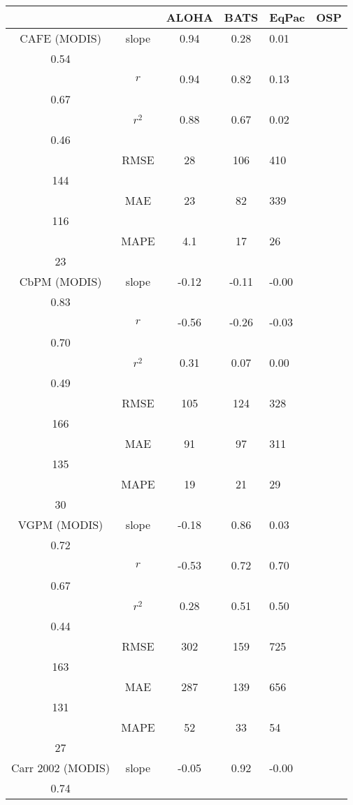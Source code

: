 \begin{table}[h]
\centering
\begin{tabular}{cccc}
\toprule
& & ALOHA & BATS & EqPac & OSP \\
\midrule
CAFE (MODIS) & slope & 0.94 & 0.28 & 0.01 &  \\
0.54 \\
& $r$ & 0.94 & 0.82 & 0.13 &  \\
0.67 \\
& $r^2$ & 0.88 & 0.67 & 0.02 &  \\
0.46 \\
& RMSE & 28 & 106 & 410 &  \\
144 \\
& MAE & 23 & 82 & 339 &  \\
116 \\
& MAPE & 4.1 & 17 & 26 &  \\
23 \\
\cmidrule(lr){1-6}
CbPM (MODIS) & slope & -0.12 & -0.11 & -0.00 &  \\
0.83 \\
& $r$ & -0.56 & -0.26 & -0.03 &  \\
0.70 \\
& $r^2$ & 0.31 & 0.07 & 0.00 &  \\
0.49 \\
& RMSE & 105 & 124 & 328 &  \\
166 \\
& MAE & 91 & 97 & 311 &  \\
135 \\
& MAPE & 19 & 21 & 29 &  \\
30 \\
\cmidrule(lr){1-6}
VGPM (MODIS) & slope & -0.18 & 0.86 & 0.03 &  \\
0.72 \\
& $r$ & -0.53 & 0.72 & 0.70 &  \\
0.67 \\
& $r^2$ & 0.28 & 0.51 & 0.50 &  \\
0.44 \\
& RMSE & 302 & 159 & 725 &  \\
163 \\
& MAE & 287 & 139 & 656 &  \\
131 \\
& MAPE & 52 & 33 & 54 &  \\
27 \\
\cmidrule(lr){1-6}
Carr 2002 (MODIS) & slope & -0.05 & 0.92 & -0.00 &  \\
0.74 \\

\end{tabular}
\end{table}
